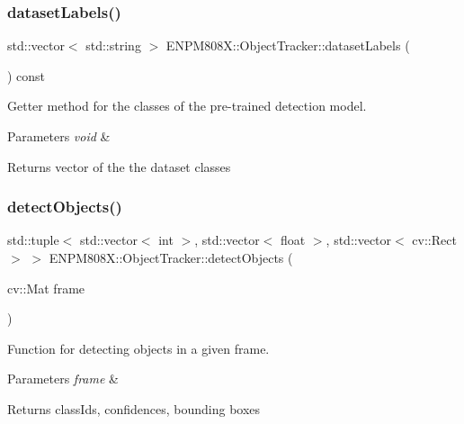 \subsubsection{\texorpdfstring{dataset\+Labels()}{datasetLabels()}}
{\footnotesize\ttfamily std\+::vector$<$ std\+::string $>$ E\+N\+P\+M808\+X\+::\+Object\+Tracker\+::dataset\+Labels (\begin{DoxyParamCaption}{ }\end{DoxyParamCaption}) const}



Getter method for the classes of the pre-\/trained detection model. 


\begin{DoxyParams}{Parameters}
{\em void} & \\
\hline
\end{DoxyParams}
\begin{DoxyReturn}{Returns}
vector of the the dataset classes 
\end{DoxyReturn}
\mbox{\label{class_e_n_p_m808_x_1_1_object_tracker_a109217a8fae2ca7ec36eb8e437e82b45}} 
\subsubsection{\texorpdfstring{detect\+Objects()}{detectObjects()}}
{\footnotesize\ttfamily std\+::tuple$<$ std\+::vector$<$ int $>$, std\+::vector$<$ float $>$, std\+::vector$<$ cv\+::\+Rect $>$ $>$ E\+N\+P\+M808\+X\+::\+Object\+Tracker\+::detect\+Objects (\begin{DoxyParamCaption}\item[{cv\+::\+Mat}]{frame }\end{DoxyParamCaption})}



Function for detecting objects in a given frame. 


\begin{DoxyParams}{Parameters}
{\em frame} & \\
\hline
\end{DoxyParams}
\begin{DoxyReturn}{Returns}
class\+Ids, confidences, bounding boxes 
\end{DoxyReturn}
\mbox{\label{class_e_n_p_m808_x_1_1_object_tracker_a488d16d7015a48a0fbdd0cf4b766bb54}} 
